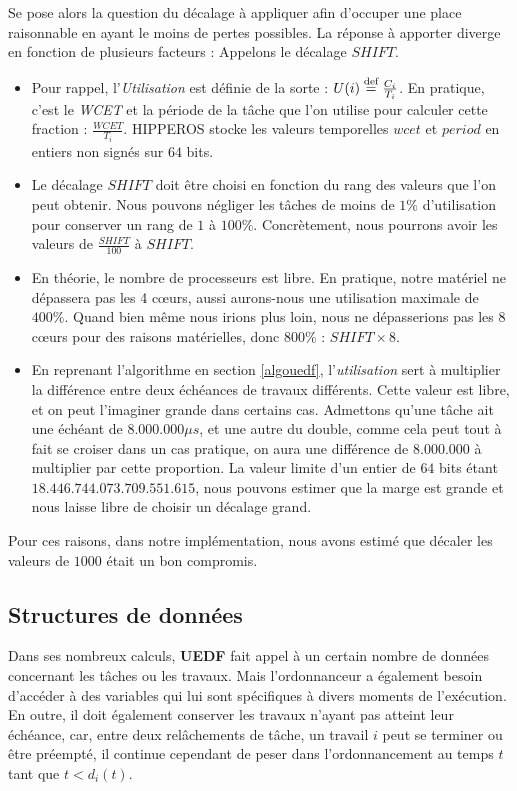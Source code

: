 		Se pose alors la question du décalage à appliquer afin d'occuper une place raisonnable en ayant 
		le moins de pertes possibles.  
		La réponse à apporter diverge en fonction de plusieurs facteurs :
		Appelons le décalage $SHIFT$.
		\begin{itemize}
			\setlength\itemsep{0.1em}
			\item Pour rappel, l'\textit{Utilisation} est définie de la sorte : $U(i) \stackrel{\text{def}}{=} \frac{C_i}{T_i}$. 
			En pratique, c'est le \textit{WCET} et la période de la tâche que l'on utilise pour calculer cette fraction : 
			$\frac{WCET}{T_i}$.
			HIPPEROS stocke les valeurs temporelles $wcet$ et $period$ en entiers non signés sur $64$ bits.
			
			\item Le décalage $SHIFT$ doit être choisi en fonction du rang des valeurs que l'on peut obtenir.
			Nous pouvons négliger les tâches de moins de $1 \%$ d'utilisation pour conserver un rang de $1$ à $100\%$.
			Concrètement, nous pourrons avoir les valeurs de $\frac{SHIFT}{100}$ à $SHIFT$.
			\item En théorie, le nombre de processeurs est libre. En pratique, 
			notre matériel ne dépassera pas les 4 cœurs, aussi aurons-nous une utilisation maximale de $400\%$.
			Quand bien même nous irions plus loin, nous ne dépasserions pas les 8 cœurs pour des raisons 
			matérielles, donc 800\% : $SHIFT \times 8$.
			\item En reprenant l'algorithme en section \ref{algouedf}, 
			l'\textit{utilisation} sert à multiplier la différence entre deux échéances de travaux différents.
			Cette valeur est libre, et on peut l'imaginer grande dans certains cas. 
			Admettons qu'une tâche ait une échéant de $8.000.000 \mu s$, et une autre du double, comme cela 
			peut tout à fait se croiser dans un cas pratique, on aura une différence de $8.000.000$ à multiplier
			par cette proportion. 
			La valeur limite d'un entier de $64$ bits étant $18.446.744.073.709.551.615$, nous pouvons estimer que la marge 
			est grande et nous laisse libre de choisir un décalage grand.
		\end{itemize}
		Pour ces raisons, dans notre implémentation, nous avons estimé que décaler les valeurs de $1000$ était un bon compromis. 
		
	\subsection{Structures de données}
		Dans ses nombreux calculs, \textbf{UEDF} fait appel à un certain nombre de données concernant les tâches ou les travaux.
		Mais l'ordonnanceur a également besoin d'accéder à des variables qui lui sont 
		spécifiques à divers moments de l'exécution. 
		En outre, il doit également conserver les travaux n'ayant pas atteint leur échéance, 
		car, entre deux relâchements de tâche, un travail $i$ peut se terminer ou être préempté, 
		il continue cependant de \og{}peser\fg{} dans l'ordonnancement au temps $t$ tant que $t < d_i(t)$.
		\newline
				
